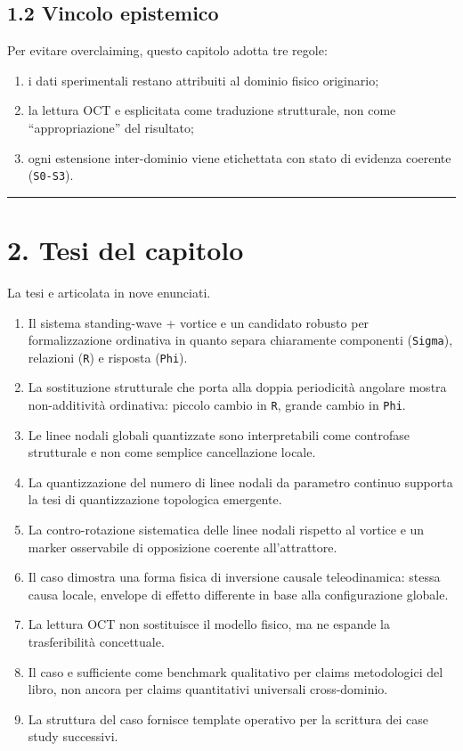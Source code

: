 \subsection{1.2 Vincolo epistemico}

Per evitare overclaiming, questo capitolo adotta tre regole:

\begin{enumerate}
\def\labelenumi{\arabic{enumi}.}
\tightlist
\item
  i dati sperimentali restano attribuiti al dominio fisico originario;
\item
  la lettura OCT e esplicitata come traduzione strutturale, non come ``appropriazione'' del risultato;
\item
  ogni estensione inter-dominio viene etichettata con stato di evidenza coerente (\texttt{S0-S3}).
\end{enumerate}

\begin{center}\rule{0.5\linewidth}{0.5pt}\end{center}

\section{2. Tesi del capitolo}

La tesi e articolata in nove enunciati.

\begin{enumerate}
\def\labelenumi{\arabic{enumi}.}
\tightlist
\item
  Il sistema standing-wave + vortice e un candidato robusto per formalizzazione ordinativa in quanto separa chiaramente componenti (\texttt{Sigma}), relazioni (\texttt{R}) e risposta (\texttt{Phi}).
\item
  La sostituzione strutturale che porta alla doppia periodicità angolare mostra non-additività ordinativa: piccolo cambio in \texttt{R}, grande cambio in \texttt{Phi}.
\item
  Le linee nodali globali quantizzate sono interpretabili come controfase strutturale e non come semplice cancellazione locale.
\item
  La quantizzazione del numero di linee nodali da parametro continuo supporta la tesi di quantizzazione topologica emergente.
\item
  La contro-rotazione sistematica delle linee nodali rispetto al vortice e un marker osservabile di opposizione coerente all'attrattore.
\item
  Il caso dimostra una forma fisica di inversione causale teleodinamica: stessa causa locale, envelope di effetto differente in base alla configurazione globale.
\item
  La lettura OCT non sostituisce il modello fisico, ma ne espande la trasferibilità concettuale.
\item
  Il caso e sufficiente come benchmark qualitativo per claims metodologici del libro, non ancora per claims quantitativi universali cross-dominio.
\item
  La struttura del caso fornisce template operativo per la scrittura dei case study successivi.
\end{enumerate}

